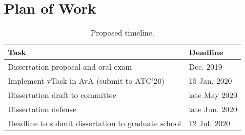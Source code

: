 \section{Plan of Work}
\begin{table}[htbp!]
\centering
\begin{tabular}{ll}
\toprule
Task 														& Deadline \\
\midrule
Dissertation proposal and oral exam							& Dec. 2019 \\
Implement vTask in AvA (submit to ATC'20) 					& 15 Jan. 2020 \\
Dissertation draft to committee								& late May 2020 \\
Dissertation defense										& late Jun. 2020 \\
Deadline to submit dissertation to graduate school 			& 12 Jul. 2020 \\
\bottomrule
\end{tabular}
\caption{Proposed timeline.}
\label{tab:timeline}
\end{table}
